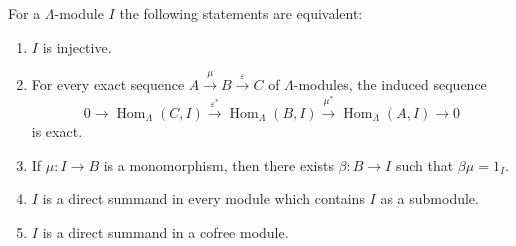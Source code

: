 For a $\Lambda$-module $I$ the following statements are equivalent:
\begin{enumerate}
\item[(1)] $I$ is injective.
\item[(2)] For every exact sequence $A \xrightarrow{\mu} B \xrightarrow{\varepsilon} C$ of $\Lambda$-modules, the induced sequence
$$0 \to \operatorname{Hom}_{\Lambda}(C, I) \xrightarrow{\varepsilon^{*}} \operatorname{Hom}_{\Lambda}(B, I) \xrightarrow{\mu^{*}} \operatorname{Hom}_{\Lambda}(A, I) \to 0$$
is exact.
\item[(3)] If $\mu : I \to B$ is a monomorphism, then there exists $\beta : B \to I$ such that $\beta \mu = 1_I$.
\item[(4)] $I$ is a direct summand in every module which contains $I$ as a submodule.
\item[(5)] $I$ is a direct summand in a cofree module.
\end{enumerate}

